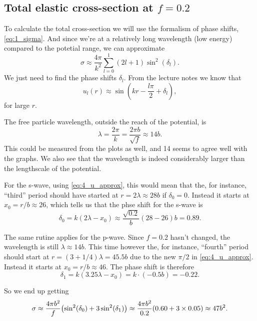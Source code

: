 \documentclass[11pt,letter, swedish, english
]{article}
\begin{document}
\subsection{Total elastic cross-section at $f=0.2$}
To calculate the total cross-section we will use the formalism of
phase shifts, \eqref{eq:1_sigma}. 
And since we're at a relatively long wavelength (low energy) compared
to the potetial range, we can approximate
\begin{equation}
\sigma\approx\frac{4\pi}{k^2}\sum_{l=0}^1(2l+1)\sin^2(\delta_l).
\end{equation}
We just need to find the phase shifts $\delta_l$. From the lecture
notes we know that
\begin{equation}\label{eq:4_u_approx}
u_l(r)\approx \sin(kr-\frac{l\pi}{2} + \delta_l),
\end{equation}
for large $r$.

The free particle wavelength, outside the reach of the potential, is 
\begin{equation}
\lambda=\frac{2\pi}{k}=\frac{2\pi b}{\sqrt{f}}
\approx 14 b.
\end{equation}
This could be measured from the plots as well, and 14 seems to agree
well with the graphs. We also see that the wavelength is indeed
considerably larger than the lengthscale of the potential. 

For the s-wave, using \eqref{eq:4_u_approx}, this would mean that the,
for instance, ``third'' period should have started at
$r=2\lambda\approx28b$ if $\delta_0=0$. Instead it starts at
$x_0=r/b\approx26$, which tells us that the phse shift for the s-wave
is  
\begin{equation}
\delta_0=k(2\lambda-x_0)\approx\frac{\sqrt{0.2}}{b}(28-26)b
=0.89.
\end{equation}


The same rutine applies for the p-wave. Since $f=0.2$ hasn't changed,
the wavelength is still $\lambda\approx14b$. This time however the,
for instance, ``fourth'' period should start at
$r=(3+1/4)\lambda=45.5b$ due to the new $\pi/2$ in
\eqref{eq:4_u_approx}. Instead it starts at $x_0=r/b\approx46$.
The phase shift is therefore
\begin{equation}
\delta_1=k(3.25\lambda-x_0)=k\cdot(-0.5b)= -0.22.
\end{equation}


So we end up getting
\begin{equation}
\sigma\approx\frac{4\pi b^2}{f}
\qty(\sin^2(\delta_0)+3\sin^2(\delta_1))
\approx\frac{4\pi b^2}{0.2}\qty(0.60+3\times0.05)
\approx 47 b^2.
\end{equation}
\end{document}
